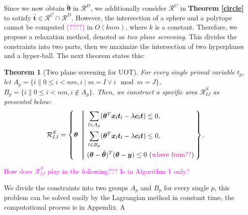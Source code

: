 \documentclass[twoside]{article}
\theoremstyle{plain}
\newtheorem{thm}{Theorem}
\newcommand{\tranT}{T}
\renewcommand{\vec}[1]{\bm{#1}}
\newcommand{\note}[1]{\textcolor{magenta}{#1}}
\begin{document}
Since we now obtain $\tilde{\vec{\theta}}$ in $\mathcal{R}^{D}$, we additionally consider $\mathcal{R}^{C}$ in {\bf Theorem \ref{circle}} to satisfy $\hat{\vec{t}} \in \mathcal{R}^{C}\cap\mathcal{R}^{D}$. However, the intersection of a sphere and a polytope cannot be computed \note{(????)} in $O(knm)$, where $k$ is a constant. Therefore, we propose a relaxation method, denoted as {\it two plane screening}. This divides the constraints into two parts, then we maximize the intersection of two hyperplanes and a hyper-ball. The next theorem states this:
%
\begin{thm}[Two plane screening for UOT]
\label{Thm:AreaScreeningUOT}
For every single primal variable $t_p$, let $A_p = \{ i \| 0\leq i<nm, i\mid m = I \vee i\mod m = J\}$, $B_p = \{ i \| 0\leq i<nm, i \notin A_p\}$. Then, we construct a specific area $\mathcal{R}^{S}_{IJ}$ as presented below:
 \begin{equation}
\begin{split} 
\mathcal{R}^S_{IJ} = \left\{\vec{\theta} \ \left|\!\left| \ 
\begin{aligned}
 &\sum_{l\in A_p}(\vec{\theta}^{\tranT}\vec{x}_{l}\vec{t}_l - \lambda \vec{c}_l \vec{t})\leq 0, \\
 &\sum_{l\in B_p}(\vec{\theta}^{\tranT}\vec{x}_{l}\vec{t}_l - \lambda \vec{c}_l \vec{t})\leq 0, \\
  &(\vec{\theta}-\tilde{\vec{\theta}})^{\tranT}(\vec{\theta}-\vec{y})\leq 0 \ (\note{\text{where from??}})
\end{aligned}
\right.\right.
\right\}.
\end{split}
\label{eq:divide}
\end{equation}
\end{thm}

\note{How does $\mathcal{R}^{S}_{IJ}$ play in the following??? Is in Algorithm 1 only?}



We divide the constraints into two groups $A_p$ and $B_p$ for every single $p$, this problem can be solved easily by the Lagrangian method in constant time, the computational process is in Appendix. A
\end{document}
